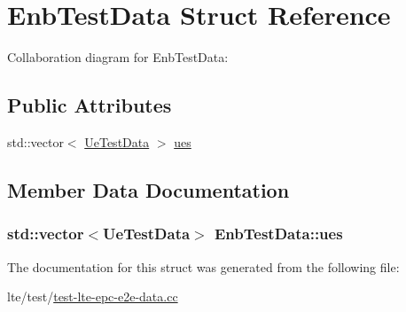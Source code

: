 \hypertarget{structEnbTestData}{}\section{Enb\+Test\+Data Struct Reference}
\label{structEnbTestData}


Collaboration diagram for Enb\+Test\+Data\+:
\subsection*{Public Attributes}
\begin{DoxyCompactItemize}
\item 
std\+::vector$<$ \hyperlink{structUeTestData}{Ue\+Test\+Data} $>$ \hyperlink{structEnbTestData_a0b5de379df31368a33410980a16d2dd7}{ues}
\end{DoxyCompactItemize}


\subsection{Member Data Documentation}
\subsubsection[{\texorpdfstring{ues}{ues}}]{\setlength{\rightskip}{0pt plus 5cm}std\+::vector$<${\bf Ue\+Test\+Data}$>$ Enb\+Test\+Data\+::ues}\hypertarget{structEnbTestData_a0b5de379df31368a33410980a16d2dd7}{}\label{structEnbTestData_a0b5de379df31368a33410980a16d2dd7}


The documentation for this struct was generated from the following file\+:\begin{DoxyCompactItemize}
\item 
lte/test/\hyperlink{test-lte-epc-e2e-data_8cc}{test-\/lte-\/epc-\/e2e-\/data.\+cc}\end{DoxyCompactItemize}
